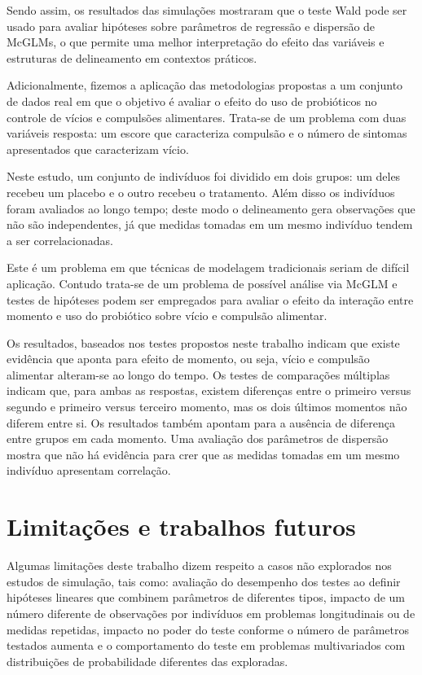 Sendo assim, os resultados das simulações mostraram que o teste Wald pode ser usado para avaliar hipóteses sobre parâmetros de regressão e dispersão de McGLMs, o que permite uma melhor interpretação do efeito das variáveis e estruturas de delineamento em contextos práticos.

Adicionalmente, fizemos a aplicação das metodologias propostas a um conjunto de dados real em que o objetivo é avaliar o efeito do uso de probióticos no controle de vícios e compulsões alimentares. Trata-se de um problema com duas variáveis resposta: um escore que caracteriza compulsão e o número de sintomas apresentados que caracterizam vício. 

Neste estudo, um conjunto de indivíduos foi dividido em dois grupos: um deles recebeu um placebo e o outro recebeu o tratamento. Além disso os indivíduos foram avaliados ao longo tempo; deste modo o delineamento gera observações que não são independentes, já que medidas tomadas em um mesmo indivíduo tendem a ser correlacionadas. 

Este é um problema em que técnicas de modelagem tradicionais seriam de difícil aplicação. Contudo trata-se de um problema de possível análise via McGLM e testes de hipóteses podem ser empregados para avaliar o efeito da interação entre momento e uso do probiótico sobre vício e compulsão alimentar.

Os resultados, baseados nos testes propostos neste trabalho indicam que existe evidência que aponta para efeito de momento, ou seja, vício e compulsão alimentar alteram-se ao longo do tempo. Os testes de comparações múltiplas indicam que, para ambas as respostas, existem diferenças entre o primeiro versus segundo e primeiro versus terceiro momento, mas os dois últimos momentos não diferem entre si. Os resultados também apontam para a ausência de diferença entre grupos em cada momento. Uma avaliação dos parâmetros de dispersão mostra que não há evidência para crer que as medidas tomadas em um mesmo indivíduo apresentam correlação.


\section{Limitações e trabalhos futuros}

Algumas limitações deste trabalho dizem respeito a casos não explorados nos estudos de simulação, tais como: avaliação do desempenho dos testes ao definir hipóteses lineares que combinem parâmetros de diferentes tipos, impacto de um número diferente de observações por indivíduos em problemas longitudinais ou de medidas repetidas, impacto no poder do teste conforme o número de parâmetros testados aumenta e o comportamento do teste em problemas multivariados com distribuições de probabilidade diferentes das exploradas.


